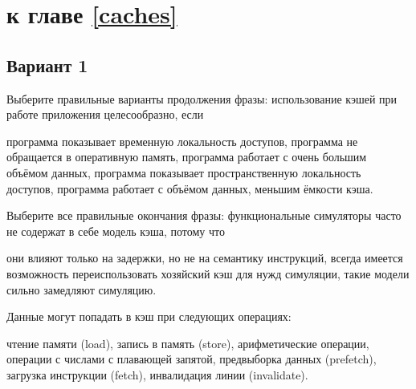 \section{\Questions к главе \ref{caches}} %

\subsection*{Вариант 1}

\begin{questions}
\question[3] Выберите правильные варианты продолжения фразы: использование кэшей при работе приложения целесообразно, если
\begin{choices}
    \correctchoice    программа показывает временную локальность доступов,
    \choice программа не обращается в оперативную память,
    \choice программа работает с очень большим объёмом данных,
    \correctchoice программа показывает пространственную локальность доступов,
    \choice программа работает с объёмом данных, меньшим ёмкости кэша.
\end{choices}

\question[3] Выберите все правильные окончания фразы: функциональные симуляторы часто не содержат в себе модель кэша, потому что
\begin{choices}
    \correctchoice они влияют только на задержки, но не на семантику инструкций,
    \choice всегда имеется возможность переиспользовать хозяйский кэш для нужд симуляции,
    \correctchoice такие модели сильно замедляют симуляцию.
\end{choices}

\question[3] Данные могут попадать в кэш при следующих операциях:
\begin{choices}
    \correctchoice чтение памяти (load),
    \correctchoice запись в память (store),
    \choice арифметические операции,
    \choice операции с числами с плавающей запятой,
    \correctchoice предвыборка данных (prefetch),
    \correctchoice загрузка инструкции (fetch),
    \choice инвалидация линии (invalidate).
\end{choices}

\end{questions}

